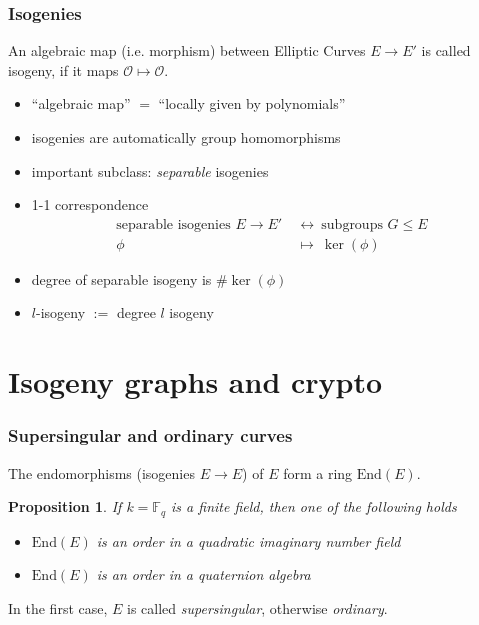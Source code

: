 \documentclass{beamer}
\newcommand{\F}{\mathbb{F}}
\newcommand{\End}{\mathrm{End}}
\renewcommand{\O}{\mathcal{O}}
\newtheorem{proposition}{Proposition}
\begin{document}
\begin{frame}
    \frametitle{Isogenies}

    \begin{definition}
        An algebraic map (i.e. morphism) between Elliptic Curves $E \to E'$ is called isogeny, if it maps $\O \mapsto \O$.
    \end{definition}
    \begin{itemize}
        \item ``algebraic map'' $=$ ``locally given by polynomials''
        \item isogenies are automatically group homomorphisms
        \item important subclass: \emph{separable} isogenies
        \item 1-1 correspondence
        \begin{align*}
            \text{separable isogenies $E \to E'$} \ &\leftrightarrow \ \text{subgroups $G \leq E$} \\
            \phi \ &\mapsto \ \ker(\phi)
        \end{align*}
        \item degree of separable isogeny is $\#\ker(\phi)$
        \item $l$-isogeny $:=$ degree $l$ isogeny
    \end{itemize}
\end{frame}

\section{Isogeny graphs and crypto}

\begin{frame}
    \frametitle{Supersingular and ordinary curves}
    The endomorphisms (isogenies $E \to E$) of $E$ form a ring $\End(E)$.
    \begin{proposition}
        If $k = \F_q$ is a finite field, then one of the following holds
        \begin{itemize}
            \item $\End(E)$ is an order in a quadratic imaginary number field
            \item $\End(E)$ is an order in a quaternion algebra
        \end{itemize}
    \end{proposition}
    \begin{definition}
        In the first case, $E$ is called \emph{supersingular}, otherwise \emph{ordinary}.
    \end{definition}
\end{frame}
\end{document}
